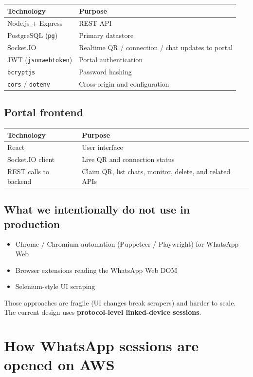 \documentclass[11pt,a4paper]{article}
\begin{document}
\begin{tabularx}{\textwidth}{L{5.2cm} X}
\toprule
\textbf{Technology} & \textbf{Purpose} \\
\midrule
Node.js + Express & REST API \\
PostgreSQL (\texttt{pg}) & Primary datastore \\
Socket.IO & Realtime QR / connection / chat updates to portal \\
JWT (\texttt{jsonwebtoken}) & Portal authentication \\
\texttt{bcryptjs} & Password hashing \\
\texttt{cors} / \texttt{dotenv} & Cross-origin and configuration \\
\bottomrule
\end{tabularx}

\subsection{Portal frontend}

\begin{tabularx}{\textwidth}{L{5.2cm} X}
\toprule
\textbf{Technology} & \textbf{Purpose} \\
\midrule
React & User interface \\
Socket.IO client & Live QR and connection status \\
REST calls to backend & Claim QR, list chats, monitor, delete, and related APIs \\
\bottomrule
\end{tabularx}

\subsection{What we intentionally do not use in production}

\begin{itemize}[leftmargin=1.2em]
  \item Chrome / Chromium automation (Puppeteer / Playwright) for WhatsApp Web
  \item Browser extensions reading the WhatsApp Web DOM
  \item Selenium-style UI scraping
\end{itemize}

Those approaches are fragile (UI changes break scrapers) and harder to scale. The current design uses \textbf{protocol-level linked-device sessions}.

\section{How WhatsApp sessions are opened on AWS}
\end{document}
